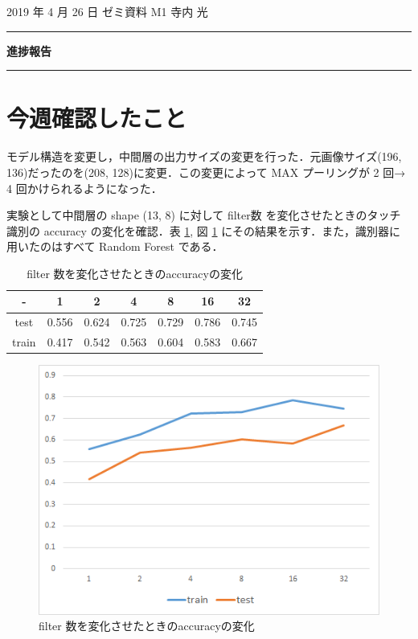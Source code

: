 \documentclass[onecolumn]{ujarticle}     %
\begin{document}
	
	
	\noindent
	
	\hspace{1em}
	2019 年 4 月 26 日
	ゼミ資料
	\hfill
	M1 寺内 光
	
	\vspace{2mm}
	
	\hrule
	
	\begin{center}
		{\Large \bf 進捗報告}
	\end{center}
	
	
	\hrule
	\vspace{3mm}
	
	\section{今週確認したこと}
	モデル構造を変更し，中間層の出力サイズの変更を行った．元画像サイズ(196, 136)だったのを(208, 128)に変更．この変更によって MAX プーリングが 2 回→ 4 回かけられるようになった． 
	
	実験として中間層の shape (13, 8) に対して filter数 を変化させたときのタッチ識別の accuracy の変化を確認．表 \ref{tab:classify_n_filter}, 図 \ref{fig:classify_n_filter} にその結果を示す．また，識別器に用いたのはすべて Random Forest である．
	\begin{table}[h]
		\centering
		\caption{filter 数を変化させたときのaccuracyの変化}
		\begin{tabular}{|c|c|c|c|c|c|c|} \hline
			-&1&2&4&8&16&32\\ \hline\hline
			test&0.556&0.624&0.725&0.729&0.786&0.745\\ \hline
			train&0.417&0.542&0.563&0.604&0.583&0.667\\ \hline
		\end{tabular}
		\label{tab:classify_n_filter}
	\end{table}

	\begin{figure}[h]
		\begin{center}
			\includegraphics[width=0.8\columnwidth]{n_filter.png}
			\caption{filter 数を変化させたときのaccuracyの変化}
			\label{fig:classify_n_filter}
		\end{center}
	\end{figure}
\end{document}

